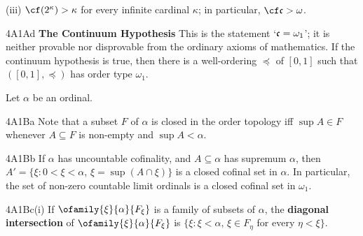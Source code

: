 \quad(iii) $\cf(2^{\kappa})>\kappa$ for every infinite
cardinal $\kappa$;  in particular, $\cf\frak c>\omega$.

\spheader 4A1Ad {\bf The Continuum Hypothesis} This is the statement
`$\frak c=\omega_1$';  it is neither provable nor disprovable from the
ordinary axioms of mathematics.
   If the continuum hypothesis is true, then there is a
well-ordering $\preccurlyeq$ of $[0,1]$ such that
$([0,1],\preccurlyeq)$
has order type $\omega_1$.

 Let $\alpha$ be an ordinal.

\spheader 4A1Ba Note that a subset $F$ of $\alpha$ is closed in the
order topology iff $\sup A\in F$ whenever
$A\subseteq F$ is non-empty and $\sup A<\alpha$.

\spheader 4A1Bb If $\alpha$ has uncountable cofinality, and
$A\subseteq\alpha$ has supremum $\alpha$, then
$A'=\{\xi:0<\xi<\alpha$, $\xi=\sup(A\cap\xi)\}$ is a closed cofinal
set in $\alpha$.
In particular,  the set of
non-zero
countable limit ordinals is a closed cofinal set in $\omega_1$.

\spheader 4A1Bc(i) If $\ofamily{\xi}{\alpha}{F_{\xi}}$ is a family of
subsets of $\alpha$,
the {\bf diagonal intersection} of $\ofamily{\xi}{\alpha}{F_{\xi}}$ is
$\{\xi:\xi<\alpha,\,\xi\in F_{\eta}$ for every $\eta<\xi\}$.

